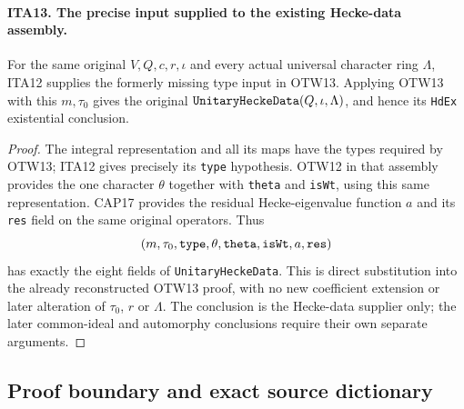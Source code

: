 \documentclass[11pt,a4paper]{article}
\numberwithin{equation}{section}
\theoremstyle{remark}\newtheorem{remark}[theorem]{Remark}
\begin{document}
\paragraph{ITA13. The precise input supplied to the existing Hecke-data assembly.}
\label{claim:ITA13}
For the same original $V,Q,c,r,\iota$ and every actual
universal character ring $\Lambda$, ITA12 supplies the
formerly missing type input in OTW13.  Applying OTW13
with this $m,\tau_0$ gives the original
$\texttt{Unitary\allowbreak Hecke\allowbreak Data}(Q,\iota,\Lambda)$, and hence
its \texttt{Hd\allowbreak Ex} existential conclusion.
\begin{proof}
The integral representation and all its maps have the
types required by OTW13; ITA12 gives precisely its
\texttt{type} hypothesis.  OTW12 in that assembly
provides the one character $\theta$ together with
\texttt{theta} and \texttt{is\allowbreak Wt}, using this same
representation.  CAP17 provides the residual
Hecke-eigenvalue function $a$ and its \texttt{res}
field on the same original operators.  Thus
\[
        (m,\tau_0,\texttt{type},\theta,
                   \texttt{theta},\texttt{is\allowbreak Wt},a,\texttt{res})
\]
has exactly the eight fields of
\texttt{Unitary\allowbreak Hecke\allowbreak Data}.  This is direct substitution
into the already reconstructed OTW13 proof, with no
new coefficient extension or later alteration of
$\tau_0$, $r$ or $\Lambda$.  The conclusion is the
Hecke-data supplier only; the later common-ideal
and automorphy conclusions require their own
separate arguments.
\end{proof}

\subsection{Proof boundary and exact source dictionary}
\end{document}
